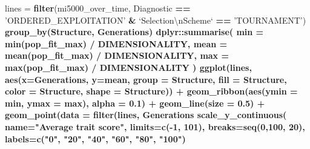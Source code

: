 \documentclass[]{book}
\newenvironment{Shaded}{\begin{snugshade}}{\end{snugshade}}
\newcommand{\CharTok}[1]{\textcolor[rgb]{0.31,0.60,0.02}{#1}}
\newcommand{\DataTypeTok}[1]{\textcolor[rgb]{0.13,0.29,0.53}{#1}}
\newcommand{\DecValTok}[1]{\textcolor[rgb]{0.00,0.00,0.81}{#1}}
\newcommand{\FloatTok}[1]{\textcolor[rgb]{0.00,0.00,0.81}{#1}}
\newcommand{\KeywordTok}[1]{\textcolor[rgb]{0.13,0.29,0.53}{\textbf{#1}}}
\newcommand{\NormalTok}[1]{#1}
\newcommand{\OperatorTok}[1]{\textcolor[rgb]{0.81,0.36,0.00}{\textbf{#1}}}
\newcommand{\StringTok}[1]{\textcolor[rgb]{0.31,0.60,0.02}{#1}}
\begin{document}
\begin{Shaded}
\begin{Highlighting}[]
\NormalTok{lines =}\StringTok{ }\KeywordTok{filter}\NormalTok{(mi5000_over_time, Diagnostic }\OperatorTok{==}\StringTok{ 'ORDERED_EXPLOITATION'} \OperatorTok{&}\StringTok{ `}\DataTypeTok{Selection}\CharTok{\textbackslash{}n}\DataTypeTok{Scheme}\StringTok{`} \OperatorTok{==}\StringTok{ 'TOURNAMENT'}\NormalTok{) }\OperatorTok{%>%}
\StringTok{  }\KeywordTok{group_by}\NormalTok{(Structure, Generations) }\OperatorTok{%>%}
\StringTok{  }\NormalTok{dplyr}\OperatorTok{::}\KeywordTok{summarise}\NormalTok{(}
    \DataTypeTok{min =} \KeywordTok{min}\NormalTok{(pop_fit_max) }\OperatorTok{/}\StringTok{ }\NormalTok{DIMENSIONALITY,}
    \DataTypeTok{mean =} \KeywordTok{mean}\NormalTok{(pop_fit_max) }\OperatorTok{/}\StringTok{ }\NormalTok{DIMENSIONALITY,}
    \DataTypeTok{max =} \KeywordTok{max}\NormalTok{(pop_fit_max) }\OperatorTok{/}\StringTok{ }\NormalTok{DIMENSIONALITY}
\NormalTok{  )}
\KeywordTok{ggplot}\NormalTok{(lines, }\KeywordTok{aes}\NormalTok{(}\DataTypeTok{x=}\NormalTok{Generations, }\DataTypeTok{y=}\NormalTok{mean, }\DataTypeTok{group =}\NormalTok{ Structure, }\DataTypeTok{fill =}\NormalTok{ Structure, }\DataTypeTok{color =}\NormalTok{ Structure, }\DataTypeTok{shape =}\NormalTok{ Structure)) }\OperatorTok{+}
\StringTok{  }\KeywordTok{geom_ribbon}\NormalTok{(}\KeywordTok{aes}\NormalTok{(}\DataTypeTok{ymin =}\NormalTok{ min, }\DataTypeTok{ymax =}\NormalTok{ max), }\DataTypeTok{alpha =} \FloatTok{0.1}\NormalTok{) }\OperatorTok{+}
\StringTok{  }\KeywordTok{geom_line}\NormalTok{(}\DataTypeTok{size =} \FloatTok{0.5}\NormalTok{) }\OperatorTok{+}
\StringTok{  }\KeywordTok{geom_point}\NormalTok{(}\DataTypeTok{data =} \KeywordTok{filter}\NormalTok{(lines, Generations }\OperatorTok{%%}\StringTok{ }\DecValTok{2000} \OperatorTok{==}\StringTok{ }\DecValTok{0}\NormalTok{), }\DataTypeTok{size =} \FloatTok{2.5}\NormalTok{, }\DataTypeTok{stroke =} \FloatTok{2.0}\NormalTok{, }\DataTypeTok{alpha =} \FloatTok{1.0}\NormalTok{) }\OperatorTok{+}
\StringTok{  }\KeywordTok{scale_y_continuous}\NormalTok{(}
    \DataTypeTok{name=}\StringTok{"Average trait score"}\NormalTok{,}
    \DataTypeTok{limits=}\KeywordTok{c}\NormalTok{(}\OperatorTok{-}\DecValTok{1}\NormalTok{, }\DecValTok{101}\NormalTok{),}
    \DataTypeTok{breaks=}\KeywordTok{seq}\NormalTok{(}\DecValTok{0}\NormalTok{,}\DecValTok{100}\NormalTok{, }\DecValTok{20}\NormalTok{),}
    \DataTypeTok{labels=}\KeywordTok{c}\NormalTok{(}\StringTok{"0"}\NormalTok{, }\StringTok{"20"}\NormalTok{, }\StringTok{"40"}\NormalTok{, }\StringTok{"60"}\NormalTok{, }\StringTok{"80"}\NormalTok{, }\StringTok{"100"}\NormalTok{)}
}}}
\end{Highlighting}
\end{Shaded}
\end{document}
